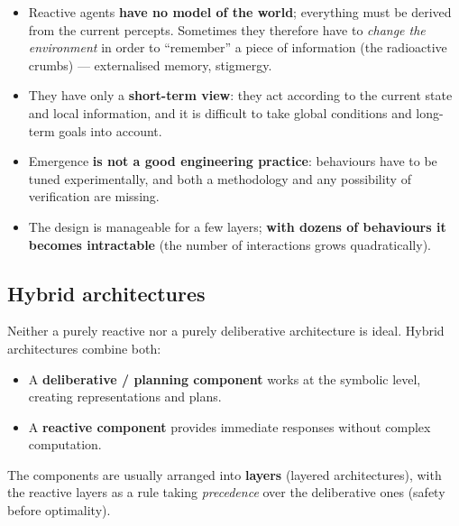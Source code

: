 \documentclass[11pt,a4paper]{article}
\theoremstyle{definition}
\providecommand{\uv}[1]{``#1''}
\begin{document}
\begin{itemize}
\item Reactive agents \textbf{have no model of the world}; everything must be derived from the
  current percepts. Sometimes they therefore have to \emph{change the environment} in order to
  \uv{remember} a piece of information (the radioactive crumbs) --- externalised memory, stigmergy.
\item They have only a \textbf{short-term view}: they act according to the current state and local
  information, and it is difficult to take global conditions and long-term goals into account.
\item Emergence \textbf{is not a good engineering practice}: behaviours have to be tuned
  experimentally, and both a methodology and any possibility of verification are missing.
\item The design is manageable for a few layers; \textbf{with dozens of behaviours it becomes
  intractable} (the number of interactions grows quadratically).
\end{itemize}

\subsection{Hybrid architectures}
\label{ssec:hybridni}

Neither a purely reactive nor a purely deliberative architecture is ideal. Hybrid architectures
combine both:
\begin{itemize}
\item A \textbf{deliberative / planning component} works at the symbolic level, creating
  representations and plans.
\item A \textbf{reactive component} provides immediate responses without complex computation.
\end{itemize}
The components are usually arranged into \textbf{layers} (layered architectures), with the reactive
layers as a rule taking \emph{precedence} over the deliberative ones (safety before optimality).
\end{document}
